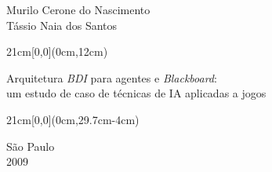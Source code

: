 \begin{center}
  {\large Murilo Cerone do Nascimento \\
    Tássio Naia dos Santos}
\end{center}

\begin{textblock*}{21cm}[0,0](0cm,12cm)
  \begin{center}
    {\LARGE Arquitetura \emph{BDI} para agentes e \emph{Blackboard}:\\
      um estudo de caso de técnicas de IA aplicadas a jogos}
  \end{center}
\end{textblock*}


\begin{textblock*}{21cm}[0,0](0cm,29.7cm-4cm)
  \begin{center}
    {\large São Paulo \\ 2009 }
  \end{center}
\end{textblock*}


